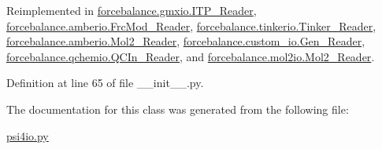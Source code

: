 \-Reimplemented in \hyperlink{classforcebalance_1_1gmxio_1_1ITP__Reader_ab35c32e7ecf74028641613f90906bd37}{forcebalance.\-gmxio.\-I\-T\-P\-\_\-\-Reader}, \hyperlink{classforcebalance_1_1amberio_1_1FrcMod__Reader_ad25c7e07aadb587268f3beb7a379766c}{forcebalance.\-amberio.\-Frc\-Mod\-\_\-\-Reader}, \hyperlink{classforcebalance_1_1tinkerio_1_1Tinker__Reader_a7078ca5338dff178edf5afb05a1f32c8}{forcebalance.\-tinkerio.\-Tinker\-\_\-\-Reader}, \hyperlink{classforcebalance_1_1amberio_1_1Mol2__Reader_a76b4f0ec6731d7072da6be5768ebf979}{forcebalance.\-amberio.\-Mol2\-\_\-\-Reader}, \hyperlink{classforcebalance_1_1custom__io_1_1Gen__Reader_a408f5717e02bcc0d87b8e60bd8b0714e}{forcebalance.\-custom\-\_\-io.\-Gen\-\_\-\-Reader}, \hyperlink{classforcebalance_1_1qchemio_1_1QCIn__Reader_a1ff6018724f2760bb6dd32dd3c854328}{forcebalance.\-qchemio.\-Q\-C\-In\-\_\-\-Reader}, and \hyperlink{classforcebalance_1_1mol2io_1_1Mol2__Reader_a39adb792b05aab536e3376ecf2ec5778}{forcebalance.\-mol2io.\-Mol2\-\_\-\-Reader}.



\-Definition at line 65 of file \-\_\-\-\_\-init\-\_\-\-\_\-.\-py.



\-The documentation for this class was generated from the following file\-:\begin{DoxyCompactItemize}
\item 
\hyperlink{psi4io_8py}{psi4io.\-py}\end{DoxyCompactItemize}
